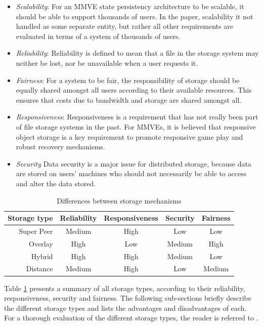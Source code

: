 \documentclass[10pt,a4paper,conference]{IEEEtran}
\begin{document}
\begin{itemize}
\item \emph{Scalability}: For an MMVE state persistency architecture to be scalable, it should be able to support thousands of users. In the
    paper, scalability it not handled as some separate entity, but rather all other requirements are evaluated in terms of a system of thousands
    of users.

\item \emph{Reliability}: Reliability is defined to mean that a file in the storage system may neither be lost, nor be unavailable when a user
    requests it.

\item \emph{Fairness}: For a system to be fair, the responsibility of storage should be equally shared amongst all users according to their
    available resources. This ensures that costs due to bandwidth and storage are shared amongst all.

\item \emph{Responsiveness}: Responsiveness is a requirement that has not really been part of file storage systems in the past. For MMVEs, it is
    believed that responsive object storage is a key requirement to promote responsive game play and robust recovery mechanisms.

\item \emph{Security} Data security is a major issue for distributed storage, because data are stored on users' machines who should not
    necessarily be able to access and alter the data stored.
\end{itemize}

\begin{table}[htbp]
\centering
\begin{tabular}{|r|c|c|c|c|}
\hline
Storage type & Reliability & Responsiveness & Security & Fairness\\
\hline
Super Peer & Medium & High & Low & Low\\
Overlay & High & Low & Medium & High\\
Hybrid & High & High & Medium & Low\\
Distance & Medium & High & Low & Medium\\
\hline
\end{tabular}
\caption{Differences between storage mechanisms \cite{gilmore_p2p_mmog_state_persistency}} \label{tab_storage}
\end{table}
%
Table \ref{tab_storage} presents a summary of all storage types, according to their reliability, responsiveness, security and fairness. The following sub-sections briefly describe the different storage types and lists the advantages and disadvantages of each. For a thorough evaluation of the different storage types, the reader is referred to \cite{gilmore_p2p_mmog_state_persistency}.
\end{document}
